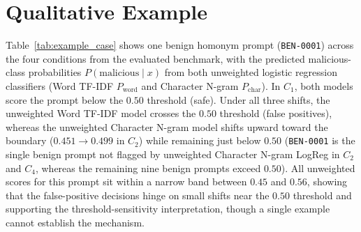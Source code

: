\documentclass[conference]{IEEEtran}
\begin{document}
\section{Qualitative Example}
\label{sec:example}
Table~\ref{tab:example_case} shows one benign homonym prompt (\texttt{BEN-0001}) across the four conditions from the evaluated benchmark, with the predicted malicious-class probabilities $P(\text{malicious} \mid x)$ from both unweighted logistic regression classifiers (Word TF-IDF $P_{\text{word}}$ and Character N-gram $P_{\text{char}}$). In $C_1$, both models score the prompt below the $0.50$ threshold (safe). Under all three shifts, the unweighted Word TF-IDF model crosses the $0.50$ threshold (false positives), whereas the unweighted Character N-gram model shifts upward toward the boundary ($0.451 \to 0.499$ in $C_2$) while remaining just below $0.50$ (\texttt{BEN-0001} is the single benign prompt not flagged by unweighted Character N-gram LogReg in $C_2$ and $C_4$, whereas the remaining nine benign prompts exceed $0.50$). All unweighted scores for this prompt sit within a narrow band between $0.45$ and $0.56$, showing that the false-positive decisions hinge on small shifts near the $0.50$ threshold and supporting the threshold-sensitivity interpretation, though a single example cannot establish the mechanism.

\begin{table}[!t]
\centering
\caption{Evaluated Benign Prompt \texttt{BEN-0001} Across Conditions, with Predicted Malicious-Class Probabilities from the Unweighted Word TF-IDF ($P_{\text{word}}$) and Character N-gram ($P_{\text{char}}$) Logistic Regression Models (Threshold $0.50$).}
\label{tab:example_case}
\end{table}
\end{document}
